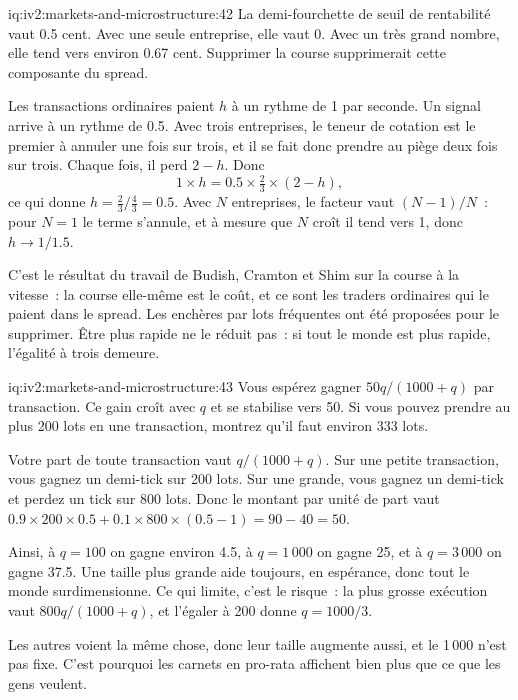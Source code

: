 \begin{solution}{iq:iv2:markets-and-microstructure:42}
La demi-fourchette de seuil de rentabilité vaut 0.5 cent. Avec une seule entreprise, elle vaut 0. Avec un très grand nombre, elle tend vers environ 0.67 cent. Supprimer la course supprimerait cette composante du spread.

Les transactions ordinaires paient $h$ à un rythme de 1 par seconde. Un signal arrive à un rythme de 0.5. Avec trois entreprises, le teneur de cotation est le premier à annuler une fois sur trois, et il se fait donc prendre au piège deux fois sur trois. Chaque fois, il perd $2 - h$. Donc
\[
1 \times h = 0.5 \times \tfrac23 \times (2 - h),
\]
ce qui donne $h = \tfrac23/\tfrac43 = 0.5$. Avec $N$ entreprises, le facteur vaut $(N - 1)/N$~: pour $N = 1$ le terme s'annule, et à mesure que $N$ croît il tend vers 1, donc $h \to 1/1.5$.

C'est le résultat du travail de Budish, Cramton et Shim sur la course à la vitesse~: la course elle-même est le coût, et ce sont les traders ordinaires qui le paient dans le spread. Les enchères par lots fréquentes ont été proposées pour le supprimer. Être plus rapide ne le réduit pas~: si tout le monde est plus rapide, l'égalité à trois demeure.

\end{solution}

\begin{solution}{iq:iv2:markets-and-microstructure:43}
Vous espérez gagner $50q/(1000 + q)$ par transaction. Ce gain croît avec $q$ et se stabilise vers 50. Si vous pouvez prendre au plus 200 lots en une transaction, montrez qu'il faut environ 333 lots.

Votre part de toute transaction vaut $q/(1000 + q)$. Sur une petite transaction, vous gagnez un demi-tick sur 200 lots. Sur une grande, vous gagnez un demi-tick et perdez un tick sur 800 lots. Donc le montant par unité de part vaut $0.9 \times 200 \times 0.5 + 0.1 \times 800 \times (0.5 - 1) = 90 - 40 = 50$.

Ainsi, à $q = 100$ on gagne environ 4.5, à $q = 1\,000$ on gagne 25, et à $q = 3\,000$ on gagne 37.5. Une taille plus grande aide toujours, en espérance, donc tout le monde surdimensionne. Ce qui limite, c'est le risque~: la plus grosse exécution vaut $800q/(1000 + q)$, et l'égaler à 200 donne $q = 1000/3$.

Les autres voient la même chose, donc leur taille augmente aussi, et le 1\,000 n'est pas fixe. C'est pourquoi les carnets en pro-rata affichent bien plus que ce que les gens veulent.

\end{solution}

